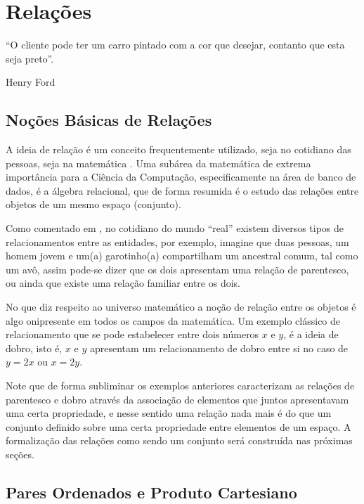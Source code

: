 \chapter{Relações}\label{cap:Relacoes}

\epigraph{``O cliente pode ter um carro pintado com a cor que desejar, contanto que esta seja preto''.}{Henry Ford}


\section{Noções Básicas de Relações}\label{sec:RelacaoParOdenado}

A ideia de relação é um conceito frequentemente utilizado, seja no cotidiano das pessoas, seja na matemática \cite{barreto1998}. Uma subárea da matemática de extrema importância para a Ciência da Computação, especificamente na área de banco de dados, é a álgebra relacional, que de forma resumida é o estudo das relações entre objetos de um mesmo espaço (conjunto). 

Como comentado em \cite{sussana2010-MD}, no cotidiano do mundo ``real'' existem diversos tipos de relacionamentos entre as entidades, por exemplo, imagine que duas pessoas, um homem jovem e um(a) garotinho(a) compartilham um ancestral comum, tal como um avô, assim pode-se dizer que os dois apresentam uma relação de parentesco, ou ainda que existe uma relação familiar entre os dois.  

No que diz respeito ao universo matemático a noção de relação entre os objetos é algo onipresente em todos os campos da matemática. Um exemplo clássico de relacionamento que se pode estabelecer entre dois números $x$ e $y$, é a ideia de dobro, isto é, $x$ e $y$ apresentam um relacionamento de dobro entre si no caso de $y = 2x$ ou $x = 2y$.

Note que de forma subliminar os exemplos anteriores caracterizam as relações de parentesco e dobro através da associação de elementos que juntos apresentavam uma certa propriedade, e nesse sentido uma relação nada mais é do que um conjunto definido sobre uma certa propriedade entre elementos de um espaço. A formalização das relações como sendo um conjunto será construída nas próximas seções.

\section{Pares Ordenados e Produto Cartesiano}\label{sec:ParesOrdenadoEProduto}

